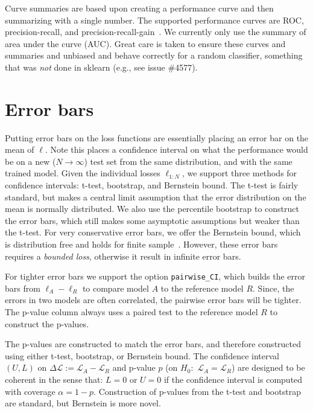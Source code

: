 \documentclass{article}
\newcommand{\Loss}{\mathcal{L}}
\newcommand{\loss}{\ell}
\newcommand{\code}{\texttt}
\begin{document}
Curve summaries are based upon creating a performance curve and then summarizing with a single number.
The supported performance curves are ROC, precision-recall, and precision-recall-gain~\citep{Flach2015}.
We currently only use the summary of area under the curve (AUC)\@.
Great care is taken to ensure these curves and summaries and unbiased and behave correctly for a random classifier, something that was \emph{not} done in sklearn (e.g., see issue \#4577)\@.

\section{Error bars}

Putting error bars on the loss functions are essentially placing an error bar on the mean of $\loss$.
Note this places a confidence interval on what the performance would be on a new ($N \rightarrow \infty$) test set from the same distribution, and with the same trained model.
Given the individual losses $\loss_{1:N}$, we support three methods for confidence intervals: t-test, bootstrap, and Bernstein bound.
The t-test is fairly standard, but makes a central limit assumption that the error distribution on the mean is normally distributed.
We also use the percentile bootstrap to construct the error bars, which still makes some asymptotic assumptions but weaker than the t-test.
For very conservative error bars, we offer the Bernstein bound, which is distribution free and holds for finite sample~\citep{Audibert2009}.
However, these error bars requires a \emph{bounded loss}, otherwise it result in infinite error bars.

For tighter error bars we support the option \code{pairwise\_CI}, which builds the error bars from $\loss_A - \loss_R$ to compare model $A$ to the reference model $R$.
Since, the errors in two models are often correlated, the pairwise error bars will be tighter.
The p-value column always uses a paired test to the reference model $R$ to construct the p-values.

The p-values are constructed to match the error bars, and therefore constructed using either t-test, bootstrap, or Bernstein bound.
The confidence interval $(U,L)$ on $\Delta \Loss := \Loss_A - \Loss_R$ and p-value $p$ (on $H_0$:~$\Loss_A = \Loss_R$) are designed to be coherent in the sense that: $L = 0$ or $U = 0$ if the confidence interval is computed with coverage $\alpha=1-p$.
Construction of p-values from the t-test and bootstrap are standard, but Bernstein is more novel.
\end{document}
